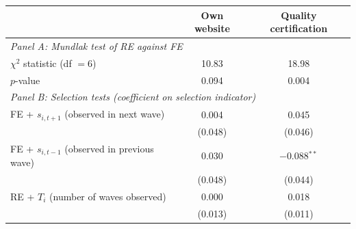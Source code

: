 \begin{tabular}{lcc}
\toprule
 & Own website & Quality certification \\
\midrule
\multicolumn{3}{l}{\textit{Panel A: Mundlak test of RE against FE}} \\
$\chi^2$ statistic (df $=6$) & 10.83 & 18.98 \\
$p$-value & 0.094 & 0.004 \\
\midrule
\multicolumn{3}{l}{\textit{Panel B: Selection tests (coefficient on selection indicator)}} \\
FE + $s_{i,t+1}$ (observed in next wave) & 0.004 & 0.045 \\
 & (0.048) & (0.046) \\
FE + $s_{i,t-1}$ (observed in previous wave) & 0.030 & $-$0.088$^{**}$ \\
 & (0.048) & (0.044) \\
RE + $T_i$ (number of waves observed) & 0.000 & 0.018 \\
 & (0.013) & (0.011) \\
\bottomrule
\end{tabular}
